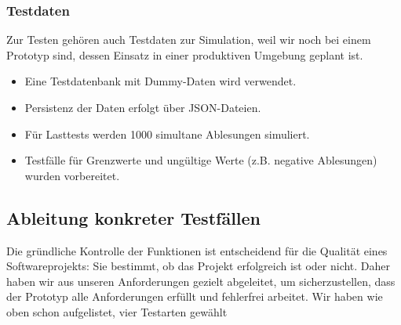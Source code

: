 \subsubsection{Testdaten}

Zur Testen gehören auch Testdaten zur Simulation, weil wir noch bei einem Prototyp sind, dessen Einsatz in einer produktiven Umgebung geplant ist.

\begin{itemize}
	\item Eine Testdatenbank mit Dummy-Daten wird verwendet.
	\item Persistenz der Daten erfolgt über JSON-Dateien.
	\item Für Lasttests werden 1000 simultane Ablesungen simuliert.
    \item Testfälle für Grenzwerte und ungültige Werte (z.B. negative Ablesungen) wurden vorbereitet.
\end{itemize}

\subsection{Ableitung konkreter Testfällen}\label{subsec:ableitung-konkreter-testfallen}

Die gründliche Kontrolle der Funktionen ist entscheidend für die Qualität eines Softwareprojekts: Sie bestimmt, ob das Projekt erfolgreich ist oder nicht.
Daher haben wir aus unseren Anforderungen gezielt abgeleitet, um sicherzustellen, dass der Prototyp alle Anforderungen erfüllt und fehlerfrei arbeitet.
Wir haben wie oben schon aufgelistet, vier Testarten gewählt

